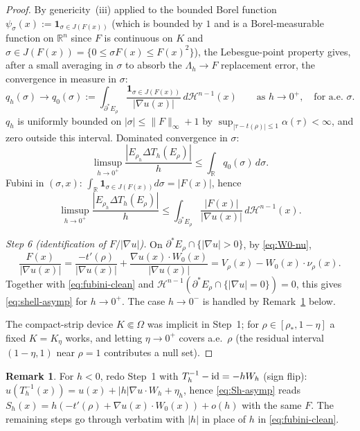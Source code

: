 \documentclass[11pt]{article}
\theoremstyle{definition}
\newtheorem{remark}[theorem]{Remark}
\newcommand{\R}{\mathbb{R}}
\newcommand{\Om}{\Omega}
\newcommand{\rstar}{\rho_{*}}
\newcommand{\Hn}{\mathcal H^{n-1}}
\begin{document}
\begin{proof}
By genericity~(iii) applied to the bounded Borel function
$\psi_\sigma(x):=\mathbf 1_{\sigma\in J(F(x))}$ (which is bounded by $1$
and is a Borel-measurable function on $\R^n$ since $F$ is continuous on
$K$ and $\sigma\in J(F(x))=\{0\le\sigma F(x)\le F(x)^2\}$), the
Lebesgue-point property gives, after a small averaging in $\sigma$ to
absorb the $\Lambda_h\to F$ replacement error, the convergence in measure
in $\sigma$:
\[
   q_h(\sigma)\to q_0(\sigma)
   :=\int_{\partial^*E_\rho}\frac{\mathbf 1_{\sigma\in J(F(x))}}{|\nabla u(x)|}
   \,d\Hn(x)\qquad\text{as }h\to0^+,\quad\text{for a.e.\ }\sigma.
\]
$q_h$ is uniformly bounded on $|\sigma|\le\|F\|_\infty+1$ by
$\sup_{|\tau-t(\rho)|\le1}\alpha(\tau)<\infty$, and zero outside this
interval. Dominated convergence in $\sigma$:
\[
   \limsup_{h\to0^+}\frac{|E_{\rho_h}\Delta T_h(E_\rho)|}{h}
   \le\int_\R q_0(\sigma)\,d\sigma.
\]
Fubini in $(\sigma,x)$: $\int_\R\mathbf 1_{\sigma\in J(F(x))}d\sigma=|F(x)|$,
hence
\begin{equation}\label{eq:fubini-clean}
   \limsup_{h\to0^+}\frac{|E_{\rho_h}\Delta T_h(E_\rho)|}{h}
   \le\int_{\partial^*E_\rho}\frac{|F(x)|}{|\nabla u(x)|}\,d\Hn(x).
\end{equation}

\smallskip
\emph{Step 6 (identification of $F/|\nabla u|$).} On
$\partial^*E_\rho\cap\{|\nabla u|>0\}$, by \eqref{eq:W0-nu},
\[
   \frac{F(x)}{|\nabla u(x)|}
   =\frac{-t'(\rho)}{|\nabla u(x)|}+\frac{\nabla u(x)\cdot W_0(x)}{|\nabla u(x)|}
   =V_\rho(x)-W_0(x)\cdot\nu_\rho(x).
\]
Together with \eqref{eq:fubini-clean} and $\Hn(\partial^*E_\rho\cap
\{|\nabla u|=0\})=0$, this gives \eqref{eq:shell-asymp} for $h\to0^+$.
The case $h\to0^-$ is handled by Remark~\ref{rem:downward} below.

The compact-strip device $K\Subset\Om$ was implicit in Step~1; for
$\rho\in[\rstar,1-\eta]$ a fixed $K=K_\eta$ works, and letting $\eta\to0^+$
covers a.e.\ $\rho$ (the residual interval $(1-\eta,1)$ near $\rho=1$
contributes a null set).
\end{proof}

\begin{remark}\label{rem:downward}
For $h<0$, redo Step~1 with $T_h^{-1}-{\rm id}=-h W_h$ (sign flip):
$u(T_h^{-1}(x))=u(x)+|h|\nabla u\cdot W_h+\eta_h$, hence
\eqref{eq:Sh-asymp} reads
$S_h(x)=h(-t'(\rho)+\nabla u(x)\cdot W_0(x))+o(h)$ with the same $F$. The
remaining steps go through verbatim with $|h|$ in place of $h$ in
\eqref{eq:fubini-clean}.
\end{remark}
\end{document}
